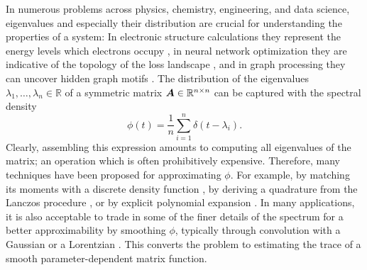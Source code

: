 \documentclass[12pt]{article}
\begin{document}
In numerous problems across physics, chemistry, engineering, and data science, eigenvalues and especially their distribution are crucial for understanding the properties of a system: In electronic structure calculations they represent the energy levels which electrons occupy \cite{lin-2017-randomized-estimation, drabold-1993-maximum-entropy, ducastelle-1970-moments-developments, haydock-1972-electronic-structure}, in neural network optimization they are indicative of the topology of the loss landscape \cite{yao-2020-pyhessian-neural, ghorbani-2019-investigation-neural}, and in graph processing they can uncover hidden graph motifs \cite{huang-2021-density-states}. The distribution of the eigenvalues $\lambda_1, \dots, \lambda_n \in \mathbb{R}$ of a symmetric matrix $\boldsymbol{A} \in \mathbb{R}^{n \times n}$ can be captured with the spectral density
\begin{equation}
    \phi(t) = \frac{1}{n} \sum_{i=1}^{n} \delta(t - \lambda_i).
\end{equation}
Clearly, assembling this expression amounts to computing all eigenvalues of the matrix; an operation which is often prohibitively expensive. Therefore, many techniques have been proposed for approximating $\phi$. For example, by matching its moments with a discrete density function \cite{cohen-steiner-2018-approximating-spectrum, braverman-2022-sublinear-time}, by deriving a quadrature from the Lanczos procedure \cite{lin-2016-approximating-spectral, chen-2021-analysis-stochastic}, or by explicit polynomial expansion \cite{weisse-2006-kernel-polynomial, lin-2016-approximating-spectral}. In many applications, it is also acceptable to trade in some of the finer details of the spectrum for a better approximability by smoothing $\phi$, typically through convolution with a Gaussian \cite{lin-2016-approximating-spectral, lin-2017-randomized-estimation} or a Lorentzian \cite{haydock-1972-electronic-structure, lin-2016-approximating-spectral}. This converts the problem to estimating the trace of a smooth parameter-dependent matrix function.
\end{document}
